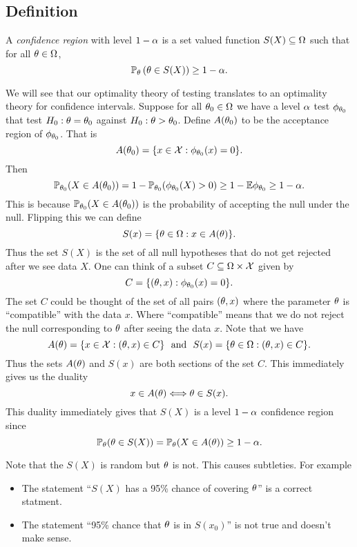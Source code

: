 \subsection{Definition}
\begin{defn}
    A \emph{confidence region} with level $1-{\alpha}$ is a set valued function $S(X) \subseteq {{\Omega}}$ such that for all ${\theta} \in {{\Omega}}$,
    \[{\mathbb{P}}_{\theta}\left({\theta} \in S(X)\right) \ge 1-{\alpha}.\]
\end{defn}
We will see that our optimality theory of testing translates to an optimality theory for confidence intervals. Suppose for all ${\theta}_0 \in {{\Omega}}$ we have a level ${\alpha}$ test $\phi_{{\theta}_0}$ that test $H_0 : {\theta} = {\theta}_0$ against $H_0 : {\theta} > {\theta}_0$. Define $A({\theta}_0)$ to be the acceptance region of $\phi_{{\theta}_0}$. That is
\[A({\theta}_0) = \{x \in {\mathcal{X}} : \phi_{{\theta}_0}(x)=0\}. \]
Then 
\[{\mathbb{P}}_{{\theta}_0}(X \in A({\theta}_0)) = 1 - {\mathbb{P}}_{{\theta}_0}(\phi_{{\theta}_0}(X) > 0) \ge 1-{\mathbb{E}}\phi_{{\theta}_0} \ge 1-{\alpha}. \]
This is because ${\mathbb{P}}_{{\theta}_0}(X \in A({\theta}_0))$ is the probability of accepting the null under the null. Flipping this we can define 
\[S(x) = \{{\theta} \in {{\Omega}} : x \in A({\theta})\}. \]
Thus the set $S(X)$ is the set of all null hypotheses that do not get rejected after we see data $X$. One can think of a subset $C \subseteq {{\Omega}} \times {\mathcal{X}}$ given by
\[C = \{({\theta},x) : \phi_{{\theta}_0}(x)=0\}. \]
The set $C$ could be thought of the set of all pairs $({\theta},x)$ where the parameter ${\theta}$ is ``compatible'' with the data $x$. Where ``compatible'' means that we do not reject the null corresponding to ${\theta}$ after seeing the data $x$. Note that we have
\[A({\theta}) = \{x \in {\mathcal{X}} : ({\theta},x) \in C\} ~~\text{and}~~ S(x) = \{{\theta} \in {{\Omega}} : ({\theta},x) \in C\}. \] 
Thus the sets $A({\theta})$ and $S(x)$ are both sections of the set $C$. This immediately gives us the duality
\[x \in A({\theta}) \Longleftrightarrow {\theta} \in S(x). \]
This duality immediately gives that $S(X)$ is a level $1-{\alpha}$ confidence region since
\[{\mathbb{P}}_{{\theta}}({\theta} \in S(X)) = {\mathbb{P}}_{{\theta}}(X \in A({\theta}))\ge 1-{\alpha}. \]
\begin{remark}
    Note that the $S(X)$ is random but ${\theta}$ is not. This causes subtleties. For example
\begin{itemize}
    \item The statement ``$S(X)$ has a 95\% chance of covering ${\theta}$'' is a correct statment.
    \item The statement ``95\% chance that ${\theta}$ is in $S(x_0)$'' is not true and doesn't make sense.
\end{itemize}
\end{remark}
